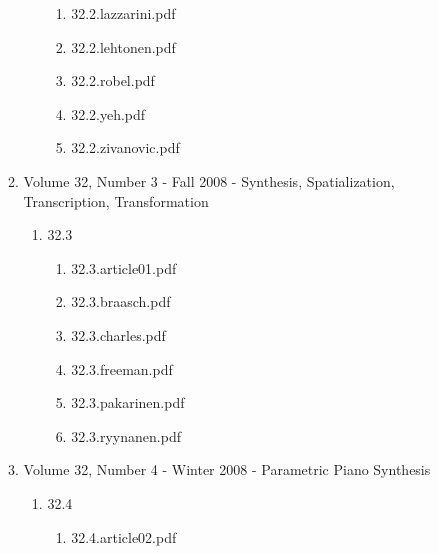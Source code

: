 \documentclass[11pt]{article}
\begin{document}
\begin{enumerate}
\begin{enumerate}
\begin{enumerate}
\begin{enumerate}
\item 32.2.lazzarini.pdf
\label{sec-1-1-1-1-11-19-19-11-1-2}

\item 32.2.lehtonen.pdf
\label{sec-1-1-1-1-11-19-19-11-1-3}

\item 32.2.robel.pdf
\label{sec-1-1-1-1-11-19-19-11-1-4}

\item 32.2.yeh.pdf
\label{sec-1-1-1-1-11-19-19-11-1-5}

\item 32.2.zivanovic.pdf
\label{sec-1-1-1-1-11-19-19-11-1-6}
\end{enumerate}
\end{enumerate}

\item Volume 32, Number 3 - Fall 2008 - Synthesis, Spatialization, Transcription, Transformation
\label{sec-1-1-1-1-11-19-19-12}
\begin{enumerate}
\item 32.3
\label{sec-1-1-1-1-11-19-19-12-1}
\begin{enumerate}
\item 32.3.article01.pdf
\label{sec-1-1-1-1-11-19-19-12-1-1}

\item 32.3.braasch.pdf
\label{sec-1-1-1-1-11-19-19-12-1-2}

\item 32.3.charles.pdf
\label{sec-1-1-1-1-11-19-19-12-1-3}

\item 32.3.freeman.pdf
\label{sec-1-1-1-1-11-19-19-12-1-4}

\item 32.3.pakarinen.pdf
\label{sec-1-1-1-1-11-19-19-12-1-5}

\item 32.3.ryynanen.pdf
\label{sec-1-1-1-1-11-19-19-12-1-6}
\end{enumerate}
\end{enumerate}

\item Volume 32, Number 4 - Winter 2008 - Parametric Piano Synthesis
\label{sec-1-1-1-1-11-19-19-13}
\begin{enumerate}
\item 32.4
\label{sec-1-1-1-1-11-19-19-13-1}
\begin{enumerate}
\item 32.4.article02.pdf
\label{sec-1-1-1-1-11-19-19-13-1-1}


\end{enumerate}
\end{enumerate}
\end{enumerate}
\end{enumerate}
\end{document}
